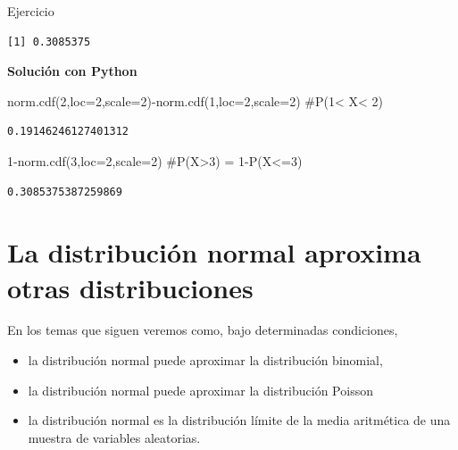 \documentclass[
  letterpaper,
  DIV=11,
  numbers=noendperiod]{scrreprt}
\newenvironment{Shaded}{\begin{snugshade}}{\end{snugshade}}
\newcommand{\CommentTok}[1]{\textcolor[rgb]{0.37,0.37,0.37}{#1}}
\newcommand{\DecValTok}[1]{\textcolor[rgb]{0.68,0.00,0.00}{#1}}
\newcommand{\NormalTok}[1]{\textcolor[rgb]{0.00,0.23,0.31}{#1}}
\newcommand{\OperatorTok}[1]{\textcolor[rgb]{0.37,0.37,0.37}{#1}}
\providecommand{\tightlist}{%
  \setlength{\itemsep}{0pt}\setlength{\parskip}{0pt}}\usepackage{longtable,booktabs,array}
\begin{document}
\begin{Ejercicio}{Ejercicio}{}
\begin{verbatim}
[1] 0.3085375
\end{verbatim}

\textbf{Solución con Python}

\begin{Shaded}
\begin{Highlighting}[]
\NormalTok{norm.cdf(}\DecValTok{2}\NormalTok{,loc}\OperatorTok{=}\DecValTok{2}\NormalTok{,scale}\OperatorTok{=}\DecValTok{2}\NormalTok{)}\OperatorTok{{-}}\NormalTok{norm.cdf(}\DecValTok{1}\NormalTok{,loc}\OperatorTok{=}\DecValTok{2}\NormalTok{,scale}\OperatorTok{=}\DecValTok{2}\NormalTok{) }\CommentTok{\#P(1\textless{} X\textless{} 2)}
\end{Highlighting}
\end{Shaded}

\begin{verbatim}
0.19146246127401312
\end{verbatim}

\begin{Shaded}
\begin{Highlighting}[]
\DecValTok{1}\OperatorTok{{-}}\NormalTok{norm.cdf(}\DecValTok{3}\NormalTok{,loc}\OperatorTok{=}\DecValTok{2}\NormalTok{,scale}\OperatorTok{=}\DecValTok{2}\NormalTok{) }\CommentTok{\#P(X\textgreater{}3) = 1{-}P(X\textless{}=3)}
\end{Highlighting}
\end{Shaded}

\begin{verbatim}
0.3085375387259869
\end{verbatim}

\end{Ejercicio}

\section{La distribución normal aproxima otras
distribuciones}\label{la-distribuciuxf3n-normal-aproxima-otras-distribuciones}

En los temas que siguen veremos como, bajo determinadas condiciones,

\begin{itemize}
\tightlist
\item
  la distribución normal puede aproximar la distribución binomial,
\item
  la distribución normal puede aproximar la distribución Poisson
\item
  la distribución normal es la distribución límite de la media
  aritmética de una muestra de variables aleatorias.
\end{itemize}
\end{document}

